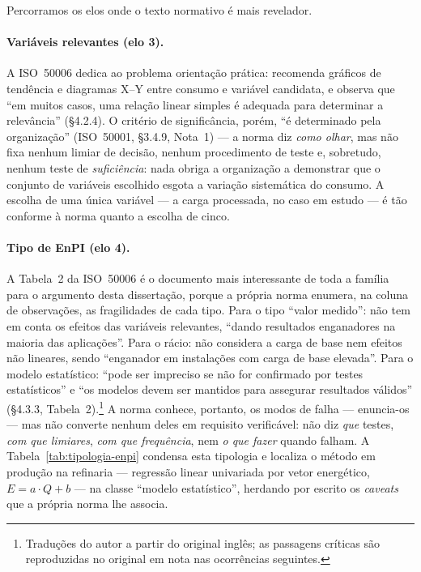 Percorramos os elos onde o texto normativo é mais revelador.

\paragraph{Variáveis relevantes (elo 3).} A ISO~50006 dedica ao problema orientação prática: recomenda gráficos de tendência e diagramas X--Y entre consumo e variável candidata, e observa que \enquote{em muitos casos, uma relação linear simples é adequada para determinar a relevância} (\S4.2.4). O critério de significância, porém, \enquote{é determinado pela organização} (ISO~50001, \S3.4.9, Nota~1) --- a norma diz \emph{como olhar}, mas não fixa nenhum limiar de decisão, nenhum procedimento de teste e, sobretudo, nenhum teste de \emph{suficiência}: nada obriga a organização a demonstrar que o conjunto de variáveis escolhido esgota a variação sistemática do consumo. A escolha de uma única variável --- a carga processada, no caso em estudo --- é tão conforme à norma quanto a escolha de cinco.

\paragraph{Tipo de EnPI (elo 4).} A Tabela~2 da ISO~50006 é o documento mais interessante de toda a família para o argumento desta dissertação, porque a própria norma enumera, na coluna de observações, as fragilidades de cada tipo. Para o tipo \enquote{valor medido}: não tem em conta os efeitos das variáveis relevantes, \enquote{dando resultados enganadores na maioria das aplicações}. Para o rácio: não considera a carga de base nem efeitos não lineares, sendo \enquote{enganador em instalações com carga de base elevada}. Para o modelo estatístico: \enquote{pode ser impreciso se não for confirmado por testes estatísticos} e \enquote{os modelos devem ser mantidos para assegurar resultados válidos} (\S4.3.3, Tabela~2).\footnote{Traduções do autor a partir do original inglês; as passagens críticas são reproduzidas no original em nota nas ocorrências seguintes.} A norma conhece, portanto, os modos de falha --- enuncia-os --- mas não converte nenhum deles em requisito verificável: não diz \emph{que} testes, \emph{com que limiares}, \emph{com que frequência}, nem \emph{o que fazer} quando falham. A Tabela~\ref{tab:tipologia-enpi} condensa esta tipologia e localiza o método em produção na refinaria --- regressão linear univariada por vetor energético, $E = a \cdot Q + b$ --- na classe \enquote{modelo estatístico}, herdando por escrito os \emph{caveats} que a própria norma lhe associa.

